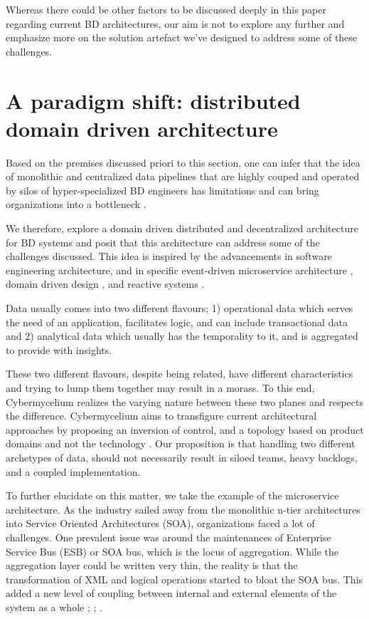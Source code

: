 \documentclass[review]{elsarticle}
\begin{document}
Whereas there could be other factors to be discussed deeply in this paper regarding current BD architectures, our aim is not to explore any further and emphasize more on the solution artefact we've designed to address some of these challenges.

\section{A paradigm shift: distributed domain driven architecture}

Based on the premises discussed priori to this section, one can infer that the idea of monolithic and centralized data pipelines that are highly couped and operated by silos of hyper-specialized BD engineers has limitations and can bring organizations into a bottleneck .

We therefore, explore a domain driven distributed and decentralized architecture for BD systems and posit that this architecture can address some of the challenges discussed. This idea is inspired by the advancements in software engineering architecture, and in specific event-driven microservice architecture \cite{EventDrivenMicroServices}, domain driven design \cite{evans2004domain}, and reactive systems \cite{aceto2007reactive}.

Data usually comes into two different flavours; 1) operational data which serves the need of an application, facilitates logic, and can include transactional data and 2) analytical data which usually has the temporality to it, and is aggregated to provide with insights.

These two different flavours, despite being related, have different characteristics and trying to lump them together may result in a morass. To this end, Cybermycelium realizes the varying nature between these two planes and respects the difference. Cybermycelium aims to transfigure current architectural approaches by proposing an inversion of control, and a topology based on product domains and not the technology \cite{dataMeshArticle}. Our proposition is that handling two different archetypes of data, should not necessarily result in siloed teams, heavy backlogs, and a coupled implementation.

To further elucidate on this matter, we take the example of the microservice architecture. As the industry sailed away from the monolithic n-tier architectures into Service Oriented Architectures (SOA), organizations faced a lot of challenges. One prevalent issue was around the maintenances of Enterprise Service Bus (ESB) or SOA bus, which is the locus of aggregation. While the aggregation layer could be written very thin, the reality is that the transformation of XML and logical operations started to bloat the SOA bus. This added a new level of coupling between internal and external elements of the system as a whole \cite{di2017architecting}; \cite{zimmermann2017microservices}; \cite{waseem2020systematic}.
\end{document}
